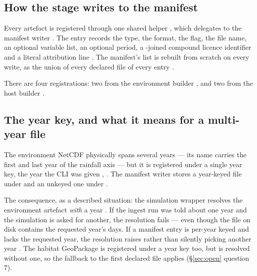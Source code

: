 \documentclass[11pt,a4paper]{article} \usepackage[utf8]{inputenc} \usepackage{lmodern} \usepackage[T1]{fontenc}
\begin{document}
\subsection{How the stage writes to the manifest}

Every artefact is registered through one shared helper
, which delegates to the manifest writer
. The entry records the type, the
format, the  flag, the file name, an optional variable list, an
optional period, a \code{+}-joined compound licence identifier and a literal attribution line
. The manifest's
 list is rebuilt from scratch on every write, as the union of every
declared file of every entry .

There are four registrations: two from the environment builder
,
 and two from the host builder
.

\subsection{The year key, and what it means for a multi-year file}

The environment NetCDF physically spans several years --- its name carries the first and last
year of the rainfall axis --- but it is registered under a single year key, the year the CLI was
given ,
. The manifest writer stores a year-keyed file
under  and an unkeyed one under 
.

The consequence, as a described situation: the simulation wrapper resolves the environment
artefact \emph{with} a year . If the ingest
run was told about one year and the simulation is asked for another, the resolution fails ---
even though the file on disk contains the requested year's days. If a manifest entry is per-year
keyed and lacks the requested year, the resolution raises rather than silently picking another
year . The habitat GeoPackage is
registered under a year key too, but is resolved without one, so the fallback to the first
declared file applies  (\S\ref{sec:open}
question 7).
\end{document}
